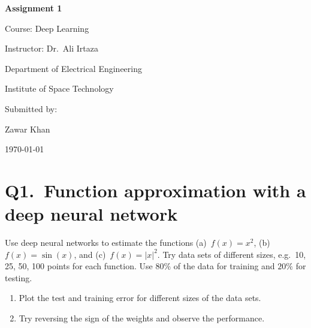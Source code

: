 \documentclass[12pt,a4paper]{article}
\begin{document}
\begin{titlepage}
  \thispagestyle{empty}
  \centering
  \vspace*{2.5cm}

  {\LARGE\bfseries Assignment 1\par}
  \vspace{1.5cm}

  {\Large Course: Deep Learning\par}
  \vspace{0.8cm}

  {\large Instructor: Dr.\ Ali Irtaza\par}
  \vspace{0.5cm}

  {\large Department of Electrical Engineering\par}
  \vspace{0.3cm}

  {\large Institute of Space Technology\par}

  \vfill

  {\large Submitted by:\par}
  \vspace{0.3cm}
  {\Large Zawar Khan\par}

  \vspace{1.5cm}
  {\large \today\par}
\end{titlepage}

\section*{Q1.\ Function approximation with a deep neural network}

Use deep neural networks to estimate the functions
(a)~$f(x)=x^{2}$,
(b)~$f(x)=\sin(x)$, and
(c)~$f(x)=|x|^{2}$.
Try data sets of different sizes, e.g.\ 10, 25, 50, 100 points for each
function. Use $80\%$ of the data for training and $20\%$ for testing.

\begin{enumerate}
  \item[(a)] Plot the test and training error for different sizes of the data sets.
  \item[(b)] Try reversing the sign of the weights and observe the performance.
\end{enumerate}
\end{document}
